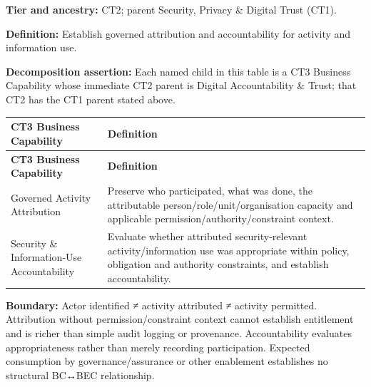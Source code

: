\textbf{Tier and ancestry:} CT2; parent Security, Privacy \& Digital Trust (CT1).

\label{rad:business:809}

\textbf{Definition:} Establish governed attribution and accountability for activity and information use.

\label{rad:business:811}

\textbf{Decomposition assertion:} Each named child in this table is a CT3 Business Capability whose immediate CT2 parent is Digital Accountability \& Trust; that CT2 has the CT1 parent stated above.

\label{rad:business:813}
\begingroup\small\setlength{\TableWidth}{\dimexpr\linewidth-4\tabcolsep-3\arrayrulewidth\relax}
\begin{longtable}{|>{\raggedright\arraybackslash}p{0.35\TableWidth}|>{\raggedright\arraybackslash}p{0.65\TableWidth}|}
\hline\rowcolor{TableHead}\textbf{CT3 Business Capability} & \textbf{Definition}\\\hline\endfirsthead
\hline\rowcolor{TableHead}\textbf{CT3 Business Capability} & \textbf{Definition}\\\hline\endhead
\hline\endfoot
Governed Activity Attribution & Preserve who participated, what was done, the attributable person/\allowbreak{}role/\allowbreak{}unit/\allowbreak{}organisation capacity and applicable permission/\allowbreak{}authority/\allowbreak{}constraint context.\\\hline
Security \& Information-Use Accountability & Evaluate whether attributed security-relevant activity/\allowbreak{}information use was appropriate within policy, obligation and authority constraints, and establish accountability.\\\hline
\end{longtable}\endgroup
{}\label{rad:business:818}

\textbf{Boundary:} Actor identified ≠ activity attributed ≠ activity permitted. Attribution without permission/\allowbreak{}constraint context cannot establish entitlement and is richer than simple audit logging or provenance. Accountability evaluates appropriateness rather than merely recording participation. Expected consumption by governance/\allowbreak{}assurance or other enablement establishes no structural BC↔BEC relationship.

\label{rad:business:820}

\par\smallskip
{}\label{rad:business:822}
